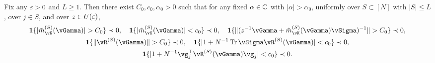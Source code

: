 \begin{lemma}\label{lemm:bounds_R(z)}
Fix any $\varepsilon>0$ and $L \geq 1$. Then there exist $C_0,c_0,\alpha_0>0$ such that
for any fixed $\alpha \in \mathbb{C}$ with $|\alpha|>\alpha_0$,
uniformly over $S \subset [N]$ with $|S| \leq L$, over $j \in S$, and over
$z \in U(\varepsilon)$,
\[\begin{gathered}
\bI\{|\tilde m_{\vK}^{(S)}(\vGamma)|>C_0\} \prec 0,
\quad \bI\{|\tilde m_{\vK}^{(S)}(\vGamma)|<c_0\} \prec 0,
\quad \bI\{\|(z^{-1}\vGamma+\tilde m_{\vK}^{(S)}(\vGamma)\vSigma)^{-1}\|>C_0\} \prec 0,\\
\bI\{\|\vR^{(S)}(\vGamma)\|>C_0\} \prec 0,
\quad \bI\{|1+N^{-1}\Tr \vSigma\vR^{(S)} (\vGamma)|<c_0\} \prec 0,\\
\bI\{|1+N^{-1}\vg_j^\top \vR^{(S)}(\vGamma) \vg_j|<c_0\} \prec 0.
\end{gathered}\]
\end{lemma}
